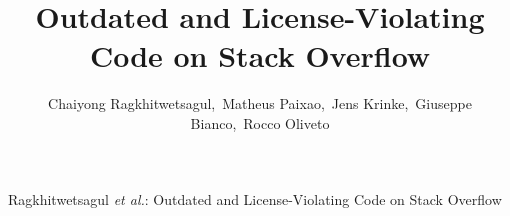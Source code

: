 \documentclass[10pt,journal,compsoc]{IEEEtran}
\begin{document}
\title{Outdated and License-Violating Code on Stack Overflow}

\author{Chaiyong Ragkhitwetsagul,~Matheus Paixao,~Jens Krinke,~Giuseppe Bianco,~Rocco Oliveto}

%
{Ragkhitwetsagul \MakeLowercase{\textit{et al.}}: Outdated and License-Violating Code on Stack Overflow}
% 

\end{document}
